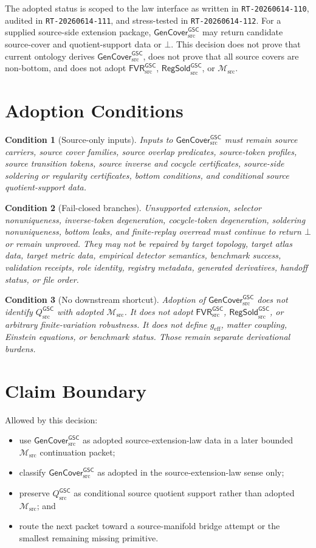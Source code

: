\documentclass[11pt]{article}
\newcommand{\Msrc}{\mathcal{M}_{\mathrm{src}}}
\newcommand{\geff}{g_{\mathrm{eff}}}
\newcommand{\GenCover}{\mathsf{GenCover}_{\mathrm{src}}^{\mathsf{GSC}}}
\newcommand{\FVR}{\mathsf{FVR}_{\mathrm{src}}^{\mathsf{GSC}}}
\newcommand{\RegSold}{\mathsf{RegSold}_{\mathrm{src}}^{\mathsf{GSC}}}
\newcommand{\Qsrc}{Q_{\mathrm{src}}^{\mathsf{GSC}}}
\newcommand{\Bot}{\bot}
\newtheorem{condition}{Condition}
\begin{document}
The adopted status is scoped to the law interface as written in
\texttt{RT-20260614-110}, audited in \texttt{RT-20260614-111}, and
stress-tested in \texttt{RT-20260614-112}. For a supplied source-side
extension package, \(\GenCover\) may return candidate source-cover and
quotient-support data or \(\Bot\). This decision does not prove that current
ontology derives \(\GenCover\), does not prove that all source covers are
non-bottom, and does not adopt \(\FVR\), \(\RegSold\), or \(\Msrc\).

\section{Adoption Conditions}

\begin{condition}[Source-only inputs]
Inputs to \(\GenCover\) must remain source carriers, source cover families,
source overlap predicates, source-token profiles, source transition tokens,
source inverse and cocycle certificates, source-side soldering or regularity
certificates, bottom conditions, and conditional source quotient-support data.
\end{condition}

\begin{condition}[Fail-closed branches]
Unsupported extension, selector nonuniqueness, inverse-token degeneration,
cocycle-token degeneration, soldering nonuniqueness, bottom leaks, and
finite-replay overread must continue to return \(\Bot\) or remain unproved.
They may not be repaired by target topology, target atlas data, target metric
data, empirical detector semantics, benchmark success, validation receipts,
role identity, registry metadata, generated derivatives, handoff status, or
file order.
\end{condition}

\begin{condition}[No downstream shortcut]
Adoption of \(\GenCover\) does not identify \(\Qsrc\) with adopted \(\Msrc\).
It does not adopt \(\FVR\), \(\RegSold\), or arbitrary finite-variation
robustness. It does not define \(\geff\), matter coupling, Einstein equations,
or benchmark status. Those remain separate derivational burdens.
\end{condition}

\section{Claim Boundary}

Allowed by this decision:
\begin{itemize}
  \item use \(\GenCover\) as adopted source-extension-law data in a later
  bounded \(\Msrc\) continuation packet;
  \item classify \(\GenCover\) as adopted in the source-extension-law sense
  only;
  \item preserve \(\Qsrc\) as conditional source quotient support rather than
  adopted \(\Msrc\); and
  \item route the next packet toward a source-manifold bridge attempt or the
  smallest remaining missing primitive.
\end{itemize}
\end{document}

